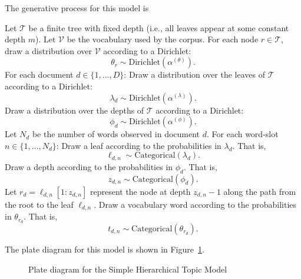 \documentclass{article}
\begin{document}
The generative process for this model is
\begin{outline}
\1 Let $\mathcal T$ be a finite tree with fixed depth (i.e., all leaves appear at some constant depth $m$).
\1 Let $\mathcal V$ be the vocabulary used by the corpus.
\1 For each node $r \in \mathcal T$, draw a distribution over $\mathcal V$ according to a Dirichlet:
\[ \theta_r \sim \text{Dirichlet}(\alpha^{(\theta)}). \]
\1 For each document $d \in \{1, \ldots, D\}$:
  \2 Draw a distribution over the leaves of $\mathcal T$ according to a Dirichlet:
  \[ \lambda_d \sim \text{Dirichlet}(\alpha^{(\lambda)}). \]
  \2 Draw a distribution over the depths of $\mathcal T$ according to a Dirichlet:
  \[ \phi_d \sim \text{Dirichlet}(\alpha^{(\phi)}). \]
  \2 Let $N_d$ be the number of words observed in document $d$.
  \2 For each word-slot $n \in \{1, \ldots, N_d\}$:
    \3 Draw a leaf according to the probabilities in $\lambda_d$.  That is,
    \[ \ell_{d,n} \sim \text{Categorical}(\lambda_d). \]
    \3 Draw a depth according to the probabilities in $\phi_d$.  That is,
    \[ z_{d,n} \sim \text{Categorical}(\phi_d). \]
    \3 Let $r_d = \ell_{d,n}[1:z_{d,n}]$ represent the node at depth $z_{d,n} - 1$ along the path from the root to the leaf $\ell_{d,n}$.
    \3 Draw a vocabulary word according to the probabilities in $\theta_{r_d}$.  That is,
    \[ t_{d,n} \sim \text{Categorical}(\theta_{r_d}). \]
\end{outline}

The plate diagram for this model is shown in Figure~\ref{fig:plate-simple}.

\begin{figure}[htb]
%
\centering
{}
%
\caption{Plate diagram for the Simple Hierarchical Topic Model}
\label{fig:plate-simple}
\end{figure}
\end{document}
